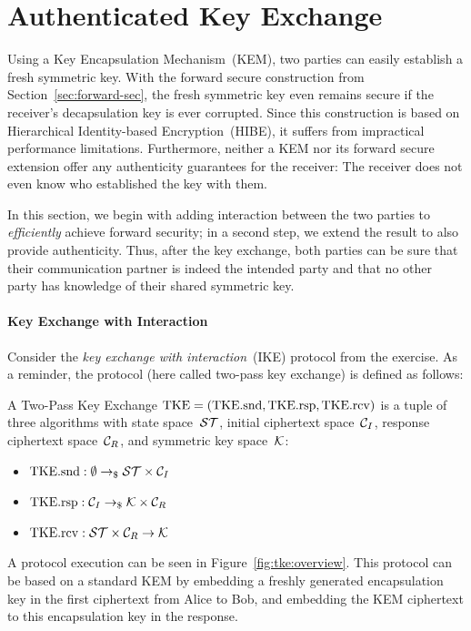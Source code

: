 \section{Authenticated Key Exchange}
\label{sec:AKE}

Using a Key Encapsulation Mechanism~(KEM), two parties can easily establish a fresh symmetric key.
With the forward secure construction from Section~\ref{sec:forward-sec}, the fresh symmetric key even remains secure if the receiver's decapsulation key is ever corrupted.
Since this construction is based on Hierarchical Identity-based Encryption~(HIBE), it suffers from impractical performance limitations.
Furthermore, neither a KEM nor its forward secure extension offer any authenticity guarantees for the receiver:
The receiver does not even know who established the key with them.

In this section, we begin with adding interaction between the two parties to \emph{efficiently} achieve forward security;
in a second step, we extend the result to also provide authenticity.
Thus, after the key exchange, both parties can be sure that their communication partner is indeed the intended party and that no other party has knowledge of their shared symmetric key.

\paragraph{Key Exchange with Interaction} 
Consider the \emph{key exchange with interaction}~(IKE) protocol from the exercise. 
As a reminder, the protocol (here called two-pass key exchange) is defined as follows:

A Two-Pass Key Exchange $\mathrm{TKE}=(\mathrm{TKE}.\mathrm{snd},\mathrm{TKE}.\mathrm{rsp},\mathrm{TKE}.\mathrm{rcv})$ is a tuple of three algorithms with state space~$\mathcal{ST}$, initial ciphertext space~$\mathcal{C}_I$, response ciphertext space~$\mathcal{C}_R$, and symmetric key space~$\mathcal{K}$:

\begin{itemize}
    \item $\mathrm{TKE}.\mathrm{snd}: \emptyset \to_\$ \mathcal{ST}\times\mathcal{C}_I$
    \item $\mathrm{TKE}.\mathrm{rsp}: \mathcal{C}_I \to_\$ \mathcal{K}\times\mathcal{C}_R$
    \item $\mathrm{TKE}.\mathrm{rcv}: \mathcal{ST}\times\mathcal{C}_R \to \mathcal{K}$
\end{itemize}

A protocol execution can be seen in Figure~\ref{fig:tke:overview}.
This protocol can be based on a standard KEM by embedding a freshly generated encapsulation key in the first ciphertext from Alice to Bob, and embedding the KEM ciphertext to this encapsulation key in the response.

